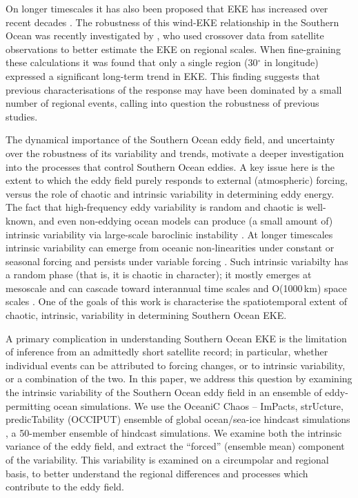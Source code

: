 \documentclass[linenumbers]{agujournal2019}
\begin{document}
On longer timescales it has also been proposed that EKE has increased over recent decades \citep{Hogg2015, Martinez-Moreno2019, Martinez-Moreno2021-ncc}.
The robustness of this wind-EKE relationship in the Southern Ocean was recently investigated by \citet{Zhang2021}, who used crossover data from satellite observations \citep[as in][]{Hogg2015} to better estimate the EKE on regional scales.
When fine-graining these calculations it was found that only a single region (30$^\circ$ in longitude) expressed a significant long-term trend in EKE.
This finding  suggests that previous characterisations of the response may have been dominated by a small number of regional events, calling into question the robustness of previous studies.

The dynamical importance of the Southern Ocean eddy field, and uncertainty over the robustness of its variability and trends, motivate a deeper investigation into the processes that control Southern Ocean eddies.
A key issue here is the extent to which the eddy field purely responds to external (atmospheric) forcing, versus the role of chaotic and intrinsic variability in determining eddy energy.
The fact that high-frequency eddy variability is random and chaotic is well-known, and even non-eddying ocean models can produce (a small amount of) intrinsic variability via large-scale baroclinic instability \citep[e.g.][]{DeVerdiere1999}.
At longer timescales intrinsic variability can emerge from oceanic non-linearities under constant or seasonal forcing and persists under variable forcing \citep{Leroux2018}.
Such intrinsic variabilty has a random phase (that is, it is chaotic in character); it mostly emerges at mesoscale and can cascade toward interannual time scales and O(1000$\,$km) space scales \citep{Serazin-etal-2018}.
One of the goals of this work is characterise the spatiotemporal extent of chaotic, intrinsic, variability in determining  Southern Ocean EKE.

A primary complication in understanding Southern Ocean EKE is the limitation of inference from an admittedly short satellite record; in particular, whether individual events can be attributed to forcing changes, or to intrinsic variability, or a combination of the two.
In this paper, we address this question by examining the intrinsic variability of the Southern Ocean eddy field in an ensemble of eddy-permitting ocean simulations.
We use the OceaniC Chaos – ImPacts, strUcture, predicTability (OCCIPUT) ensemble of global ocean/sea-ice hindcast simulations \citep{Penduff-etal-2014, Leroux2018}, a 50-member ensemble of hindcast simulations.
We examine both the intrinsic variance of the eddy field, and extract the ``forced'' (ensemble mean) component of the variability.
This variability is examined on a circumpolar and regional basis, to better understand the regional differences and processes which contribute to the eddy field.
\end{document}
